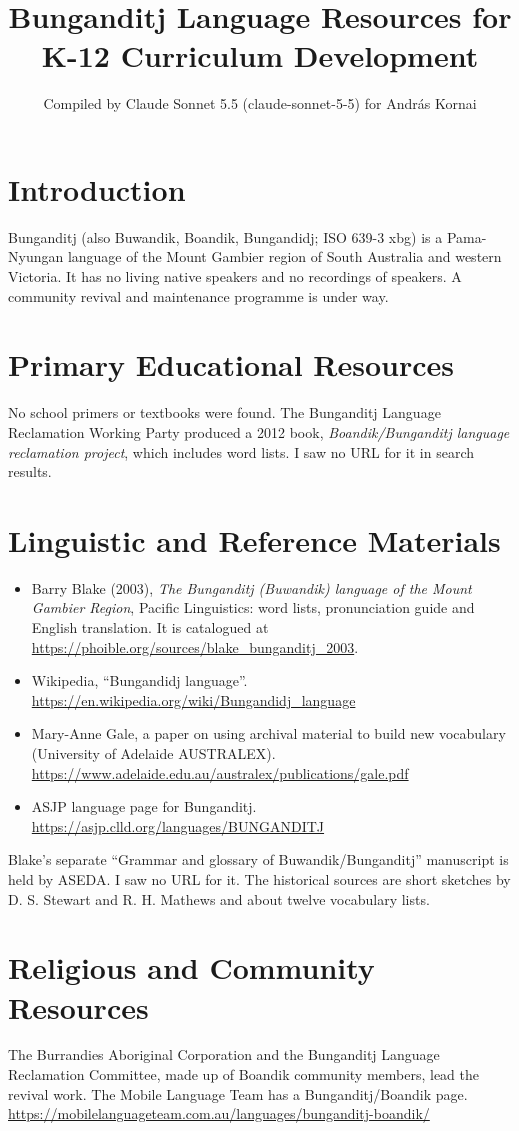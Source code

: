 \documentclass[12pt]{article}
\title{Bunganditj Language Resources for K-12 Curriculum Development}
\author{Compiled by Claude Sonnet 5.5 (claude-sonnet-5-5) for Andr\'as Kornai}
\date{}
\begin{document}
\maketitle

\section{Introduction}
Bunganditj (also Buwandik, Boandik, Bungandidj; ISO 639-3 xbg) is a Pama-Nyungan language of the Mount Gambier region of South Australia and western Victoria. It has no living native speakers and no recordings of speakers. A community revival and maintenance programme is under way.

\section{Primary Educational Resources}
No school primers or textbooks were found. The Bunganditj Language Reclamation Working Party produced a 2012 book, \emph{Boandik/Bunganditj language reclamation project}, which includes word lists. I saw no URL for it in search results.

\section{Linguistic and Reference Materials}
\begin{itemize}
\item Barry Blake (2003), \emph{The Bunganditj (Buwandik) language of the Mount Gambier Region}, Pacific Linguistics: word lists, pronunciation guide and English translation. It is catalogued at \url{https://phoible.org/sources/blake_bunganditj_2003}.
\item Wikipedia, ``Bungandidj language''. \url{https://en.wikipedia.org/wiki/Bungandidj_language}
\item Mary-Anne Gale, a paper on using archival material to build new vocabulary (University of Adelaide AUSTRALEX). \url{https://www.adelaide.edu.au/australex/publications/gale.pdf}
\item ASJP language page for Bunganditj. \url{https://asjp.clld.org/languages/BUNGANDITJ}
\end{itemize}
Blake's separate ``Grammar and glossary of Buwandik/Bunganditj'' manuscript is held by ASEDA. I saw no URL for it. The historical sources are short sketches by D. S. Stewart and R. H. Mathews and about twelve vocabulary lists.

\section{Religious and Community Resources}
The Burrandies Aboriginal Corporation and the Bunganditj Language Reclamation Committee, made up of Boandik community members, lead the revival work. The Mobile Language Team has a Bunganditj/Boandik page. \url{https://mobilelanguageteam.com.au/languages/bunganditj-boandik/}
\end{document}
